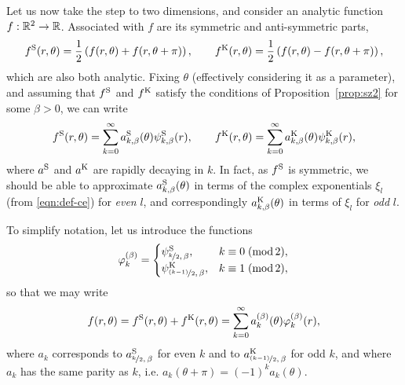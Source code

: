 Let us now take the step to two dimensions, and consider an analytic function $f:\mathbb{R}^2\to\mathbb{R}$. Associated
with $f$ are its symmetric and anti-symmetric parts,
\[
    f^{\mathrm{S}}(r,\theta) = \frac{1}{2}\left(f(r,\theta) + f(r,\theta+\pi)\right), \qquad
    f^{\mathrm{K}}(r,\theta) = \frac{1}{2}\left(f(r,\theta) - f(r,\theta+\pi)\right),
\]
which are also both analytic. Fixing $\theta$ (effectively considering it as a parameter), and assuming that
$f^{\mathrm{S}}$ and $f^{\mathrm{K}}$ satisfy the conditions of Proposition~\ref{prop:sz2} for some $\beta>0$, we can write
\[
    f^{\mathrm{S}}(r,\theta) = \sum_{k=0}^\infty a^{\mathrm{S}}_{k,\beta}(\theta) \psi^{\mathrm{S}}_{k,\beta}(r), \qquad
    f^{\mathrm{K}}(r,\theta) = \sum_{k=0}^\infty a^{\mathrm{K}}_{k,\beta}(\theta) \psi^{\mathrm{K}}_{k,\beta}(r),
\]
where $a^{\mathrm{S}}$ and $a^{\mathrm{K}}$ are rapidly decaying in $k$.  In fact, as $f^{\mathrm{S}}$ is symmetric, we should be able
to approximate $a^{\mathrm{S}}_{k,\beta}(\theta)$ in terms of the complex exponentials $\xi_l$ (from
\eqref{eqn:def-ce}) for {\em even} $l$, and correspondingly $a^{\mathrm{K}}_{k,\beta}(\theta)$ in terms of $\xi_l$ for
{\em odd} $l$.

To simplify notation, let us introduce the functions
\[
    \varphi_k^{(\beta)} = \begin{cases}
        \psi^{\mathrm{S}}_{\nicefrac{k}{2},\,\beta}, & k \equiv 0\; (\operatorname{mod} 2), \\
        \psi^{\mathrm{K}}_{\nicefrac{(k-1)}{2},\,\beta}, & k \equiv 1\; (\operatorname{mod} 2),
    \end{cases}
\]
so that we may write
\[
    f(r,\theta) = f^{\mathrm{S}}(r,\theta) + f^{\mathrm{K}}(r,\theta) =
    \sum_{k=0}^\infty a_k^{(\beta)}(\theta) \varphi_k^{(\beta)}(r),
\]
where $a_k$ corresponds to $a^{\mathrm{S}}_{\nicefrac{k}{2},\,\beta}$ for even $k$ and to
$a^{\mathrm{K}}_{\nicefrac{(k-1)}{2},\,\beta}$ for odd $k$, and where $a_k$ has the same parity as $k$, i.e.
$a_k(\theta+\pi) = (-1)^k a_k(\theta)$.

